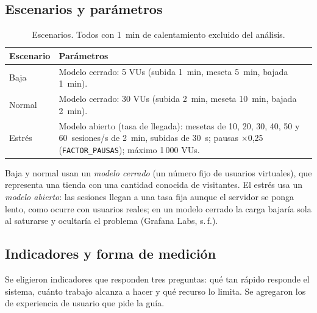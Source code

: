 \documentclass[11pt,a4paper]{article}
\newcommand{\codigo}[1]{\texttt{#1}}
\begin{document}
\subsection{Escenarios y parámetros}
\begin{table}[H]
\centering\small
\begin{tabularx}{\textwidth}{@{}lX@{}}
\toprule
Escenario & Parámetros \\
\midrule
Baja & Modelo cerrado: 5 VUs (subida 1~min, meseta 5~min, bajada 1~min). \\
Normal & Modelo cerrado: 30 VUs (subida 2~min, meseta 10~min, bajada 2~min). \\
Estrés & Modelo abierto (tasa de llegada): mesetas de 10, 20, 30, 40, 50 y 60~sesiones/s de 2~min, subidas de 30~s; pausas $\times$0,25 (\codigo{FACTOR\_PAUSAS}); máximo 1\,000 VUs. \\
\bottomrule
\end{tabularx}
\caption{Escenarios. Todos con 1~min de calentamiento excluido del análisis.}
\end{table}

Baja y normal usan un \emph{modelo cerrado} (un número fijo de usuarios
virtuales), que representa una tienda con una cantidad conocida de visitantes.
El estrés usa un \emph{modelo abierto}: las sesiones llegan a una tasa fija
aunque el servidor se ponga lento, como ocurre con usuarios reales; en un modelo
cerrado la carga bajaría sola al saturarse y ocultaría el problema
(Grafana Labs, s.\,f.).

\subsection{Indicadores y forma de medición}

Se eligieron indicadores que responden tres preguntas: qué tan rápido
responde el sistema, cuánto trabajo alcanza a hacer y qué recurso lo limita.
Se agregaron los de experiencia de usuario que pide la guía.
\end{document}
